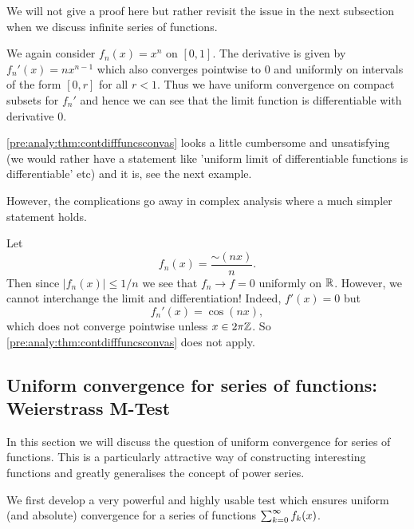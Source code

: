 \documentclass[10pt, a4paper]{article}
\newcommand{\infsumo}{\infsum[k = 0]}
\begin{document}
We will not give a proof here but rather revisit the issue in the next subsection when we discuss infinite series of functions.

\begin{example}
    We again consider $f_n(x) = x ^ n$ on $[0, 1]$.
    The derivative is given by $f_n'(x) = nx ^ {n - 1}$ which also converges pointwise to $0$ and uniformly on intervals of the form $[0, r]$ for all $r < 1$.
    Thus we have uniform convergence on compact subsets for $f_n'$ and hence we can see that the limit function is differentiable with derivative $0$.
\end{example}

\begin{remark}
    \autoref{pre:analy:thm:contdifffuncsconvas} looks a little cumbersome and unsatisfying
    (we would rather have a statement like 'uniform limit of differentiable functions is differentiable' etc)
    and it is,
    see the next example.

    However,
    the complications go away in complex analysis where a much simpler statement holds.
\end{remark}

\begin{example}
    Let
    \[
    f_n(x) = \frac{\sim(nx)}{n}.
    \]
    Then since $|f_n(x)| \leq 1 / n$ we see that $f_n \rightarrow f = 0$ uniformly on $\mathbb{R}$.
    However,
    we cannot interchange the limit and differentiation!
    Indeed,
    $f'(x) = 0$ but
    \[
    f_n'(x) = \cos(nx),
    \]
    which does not converge pointwise unless $x \in 2\pi\mathbb{Z}$.
    So \autoref{pre:analy:thm:contdifffuncsconvas} does not apply.
\end{example}

\subsection{Uniform convergence for series of functions: Weierstrass M-Test}

In this section we will discuss the question of uniform convergence for series of functions.
This is a particularly attractive way of constructing interesting functions and greatly generalises the concept of power series.

We first develop a very powerful and highly usable test which ensures uniform
(and absolute)
convergence for a series of functions $\infsumo f_k(x)$.
\end{document}

